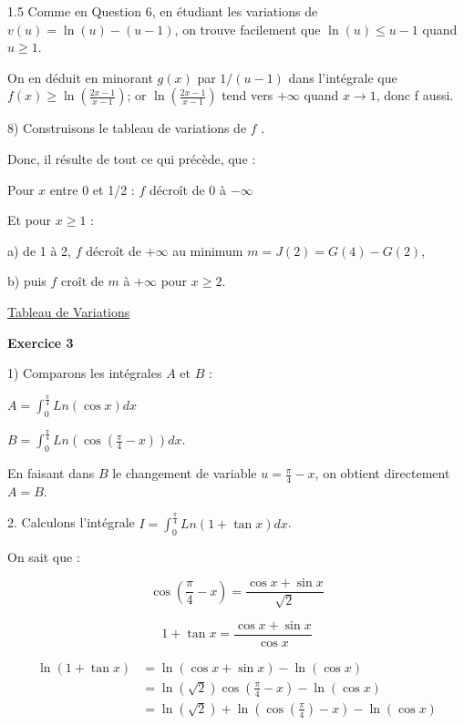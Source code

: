 \documentclass[12pt]{article}
\begin{document}
\begin{spacing}{1.5}
Comme en Question 6, en étudiant les variations de $v(u) = \ln(u)-(u-1)$, on trouve facilement que $\ln(u)\leqslant u-1$ quand $u\geqslant 1$. 

On en déduit en minorant $g(x)$ par $1/(u-1)$ dans l'intégrale que
 $f(x)\geqslant \ln(\frac{2x-1}{x-1})$; or $\ln(\frac{2x-1}{x-1})$ tend vers $+\infty$ quand $x\rightarrow 1$, donc f aussi. 

8) Construisons le tableau de variations de $f$ .   

Donc, il résulte de tout ce qui précède, que : 

Pour $x$ entre 0 et 1/2 : $f$ décroît de 0 à $-\infty$
 
Et pour $x\geqslant 1$ : 

a) de 1 à 2, $f$ décroît de $+\infty$ au minimum $m = J(2) = G(4)-G(2)$,  

b) puis $f$ croît de $m$ à $+\infty$ pour $x\geqslant 2$.

\underline{ Tableau de Variations}
\begin{center}
\end{center}







\medskip\textbf{Exercice 3}

1) Comparons les intégrales $A$ et $B$ :

$A=\int_{0}^{\frac{\pi}{4}}Ln(\cos x)dx$

$B= \int_{0}^{\frac{\pi}{4}}Ln(\cos(\frac{\pi}{4}- x))dx$.

 En faisant dans $B$ le changement de variable $u =\frac{\pi}{4}- x$, on obtient directement $A = B$.

2. Calculons l'intégrale $I=\int_{0}^{\frac{\pi}{4}}Ln(1+\tan x)dx$.

 On sait que :
 
\[\cos(\frac{\pi}{4}-x)=\frac{\cos x+\sin x}{\sqrt{2}}\]

\[
1+\tan x=\frac{\cos x+\sin x}{\cos x}\]

\begin{align*}
\ln(1+\tan x)&=\ln(\cos x+\sin x)-\ln(\cos x)\\
&=\ln(\sqrt{2})\cos(\frac{\pi}{4}-x)-\ln(\cos x)\\
&=\ln(\sqrt{2})+\ln(\cos(\frac{\pi}{4})-x)-\ln(\cos x)
\end{align*}



\end{spacing}
\end{document}
